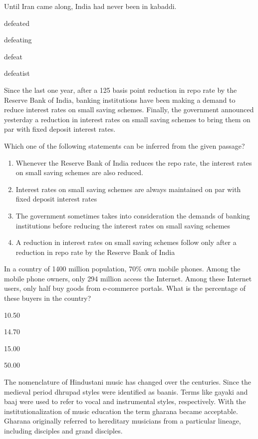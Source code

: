 \item Until Iran came along, India had never been \underline{\hspace{1cm}} in kabaddi.
\begin{enumerate}
\begin{multicols}{4}
\item defeated
\item defeating
\item defeat
\item defeatist
\end{multicols}
\end{enumerate}
\item Since the last one year, after a 125 basis point reduction in repo rate by the Reserve Bank
of India, banking institutions have been making a demand to reduce interest rates on small 
saving schemes. Finally, the government announced yesterday a reduction in interest rates 
on small saving schemes to bring them on par with fixed deposit interest rates.


Which one of the following statements can be inferred from the given passage?
\begin{enumerate}
\item Whenever the Reserve Bank of India reduces the repo rate, the interest rates on small 
saving schemes are also reduced.
\item Interest rates on small saving schemes are always maintained on par with fixed deposit 
interest rates
\item The government sometimes takes into consideration the demands of banking 
institutions before reducing the interest rates on small saving schemes
\item A reduction in interest rates on small saving schemes follow only after a reduction in 
repo rate by the Reserve Bank of India
\end{enumerate}
\item In a country of 1400 million population, 70\% own mobile phones. Among the mobile phone owners, only 294 million access the Internet. Among these Internet users, only half buy goods from e-commerce portals. What is the percentage of these buyers in the country?
\begin{enumerate}
\begin{multicols}{4}
\item 10.50
\item 14.70
\item 15.00
\item 50.00
\end{multicols}
\end{enumerate}
\item The nomenclature of Hindustani music has changed over the centuries. Since the medieval period dhrupad styles were identified as baanis. Terms like gayaki and baaj were used to refer to vocal and instrumental styles, respectively. With the institutionalization of music education the term gharana became acceptable. Gharana originally referred to hereditary 
musicians from a particular lineage, including disciples and grand disciples.

